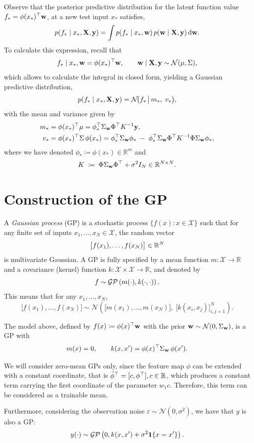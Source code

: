 Observe that the posterior predictive distribution for the latent function value 
\(f_\ast=\phi(x_\ast)^\top{ \mathbf{w}}\), 
at a new test input $x_\ast$ satisfies,
\[
p(f_\ast \mid x_\ast, { \mathbf{X}}, { \mathbf{y}})
= \int p(f_\ast \mid x_\ast, { \mathbf{w}})\, p({ \mathbf{w}} \mid { \mathbf{X}}, { \mathbf{y}})\,\mathrm d{ \mathbf{w}} .
\]
To calculate this expression, recall that
\[
f_\ast \mid x_\ast, { \mathbf{w}} = \phi(x_\ast)^\top { \mathbf{w}},
\qquad
{ \mathbf{w}} \mid { \mathbf{X}}, { \mathbf{y}} \sim \mathcal N(\mu,\Sigma),
\]
which allows to calculate the integral in closed form, yielding a Gaussian predictive distribution,
\[
p(f_\ast \mid x_\ast, { \mathbf{X}}, { \mathbf{y}})
= \mathcal N\!\bigl(f_\ast \,\big|\,
  m_\ast,\;
v_\ast
\bigr),
\]
with the mean and variance given by 
\begin{align}
    m_\ast 
&= \phi(x_\ast)^\top \mu
=\phi_\ast^\top \Sigma_{{ \mathbf{w}}}\Phi^\top K^{-1}{ \mathbf{y}},\\
v_\ast
&= \phi(x_\ast)^\top \Sigma \,\phi(x_\ast)
=\phi_\ast^\top \Sigma_{{ \mathbf{w}}}\phi_\ast
\;-\;
\phi_\ast^\top \Sigma_{{ \mathbf{w}}}\Phi^\top K^{-1}\Phi\Sigma_{{ \mathbf{w}}}\phi_\ast,
\end{align}
where we have denoted \(\phi_\ast \coloneqq \phi(x_\ast)\in\mathbb{R}^m\) and
\[
K \;\coloneqq\; \Phi \Sigma_{{ \mathbf{w}}}\Phi^\top + \sigma^2 I_N \in{\mathbb R}^{N\times N}.
\]


\section{Construction of the GP}

\begin{definition}
A \emph{Gaussian process} (GP) is a stochastic process
\(\{f(x) : x \in \mathcal X\}\) such that for any finite set of inputs
\(x_1,\ldots,x_N \in \mathcal X\), the random vector
\[
\bigl[f(x_1),\ldots,f(x_N)\bigr]\in{\mathbb R}^N
\]
is multivariate Gaussian. A GP is fully specified by a mean function
\(m:\mathcal X\to\mathbb R\) and a covariance (kernel) function
\(k:\mathcal X\times\mathcal X\to\mathbb R\), and denoted by 
\[
f \sim \mathcal{GP}\left(m(\cdot) , k(\cdot,\cdot)\right).
\]
This means that for any \(x_1,\ldots,x_N\),
\[
\bigl[f(x_1),\ldots,f(x_N)\bigr]
\sim
\mathcal N\!\left(
\bigl[m(x_1),\ldots,m(x_N)\bigr],
\;
\bigl[k(x_i,x_j)\bigr]_{i,j=1}^N
\right).
\]    
\end{definition}

The model above, defined by \(f(x)\coloneqq \phi(x)^\top { \mathbf{w}}\) with the  prior \({ \mathbf{w}}\sim\mathcal N(0,\Sigma_{{ \mathbf{w}}})\), is a GP with
\[
m(x)=0,
\qquad
k(x,x')=\phi(x)^\top \Sigma_{{ \mathbf{w}}}\,\phi(x').
\]

\begin{remark}
    We will consider zero-mean GPs only, since the feature map $\phi$ can be extended with a constant coordinate, that is $\tilde\phi^\top = [c, \phi^\top], c\in{\mathbb R}$, which produces a constant term carrying the first coordinate of the parameter $w_1c$. Therefore, this term can be considered as a trainable mean.
\end{remark}
Furthermore, considering the observation noise \(\varepsilon\sim\mathcal N(0,\sigma^2)\), we have that $y$ is also a GP:
\[
y(\cdot)\sim \mathcal{GP}\left(0 , k(x,x')+\sigma^2\mathbf{1}\{x=x'\}\right).
\]

